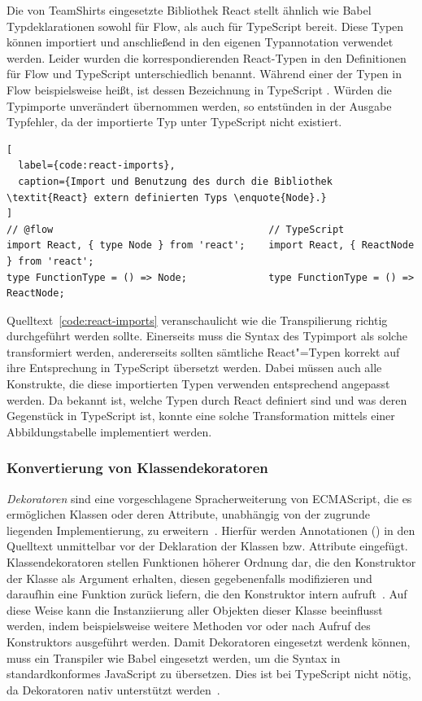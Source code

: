 {Die von TeamShirts eingesetzte Bibliothek React stellt ähnlich wie Babel Typdeklarationen sowohl für Flow, als auch für TypeScript bereit. Diese Typen können importiert und anschließend in den eigenen Typannotation verwendet werden. Leider wurden die korrespondierenden React-Typen in den Definitionen für Flow und TypeScript unterschiedlich benannt. Während einer der Typen in Flow beispielsweise  heißt, ist dessen Bezeichnung in TypeScript . Würden die Typimporte unverändert übernommen werden, so entstünden in der Ausgabe Typfehler, da der importierte Typ unter TypeScript nicht existiert.

\begin{lstlisting}[
  label={code:react-imports},
  caption={Import und Benutzung des durch die Bibliothek \textit{React} extern definierten Typs \enquote{Node}.}
]
// @flow                                     // TypeScript
import React, { type Node } from 'react';    import React, { ReactNode } from 'react';
type FunctionType = () => Node;              type FunctionType = () => ReactNode;
\end{lstlisting}

Quelltext~\ref{code:react-imports} veranschaulicht wie die Transpilierung richtig durchgeführt werden sollte. Einerseits muss die Syntax des Typimport als solche transformiert werden, andererseits sollten sämtliche React"=Typen korrekt auf ihre Entsprechung in TypeScript übersetzt werden. Dabei müssen auch alle Konstrukte, die diese importierten Typen verwenden entsprechend angepasst werden. Da bekannt ist, welche Typen durch React definiert sind und was deren Gegenstück in TypeScript ist, konnte eine solche Transformation mittels einer Abbildungstabelle implementiert werden.

\subsubsection{Konvertierung von Klassendekoratoren}
\label{sec:class-decorators}

\textit{Dekoratoren} sind eine vorgeschlagene Spracherweiterung von ECMAScript, die es ermöglichen Klassen oder deren Attribute, unabhängig von der zugrunde liegenden Implementierung, zu erweitern~\autocite{ES_PROPOSAL:DECORATORS}. Hierfür werden Annotationen () in den Quelltext unmittelbar vor der Deklaration der Klassen bzw. Attribute eingefügt. Klassendekoratoren stellen Funktionen höherer Ordnung dar, die den Konstruktor der Klasse als Argument erhalten, diesen gegebenenfalls modifizieren und daraufhin eine Funktion zurück liefern, die den Konstruktor intern aufruft~\autocite{ES_PROPOSAL:DECORATORS}. Auf diese Weise kann die Instanziierung aller Objekten dieser Klasse beeinflusst werden, indem beispielsweise weitere Methoden vor oder nach Aufruf des Konstruktors ausgeführt werden. Damit Dekoratoren eingesetzt werdenk können, muss ein Transpiler wie Babel eingesetzt werden, um die Syntax in standardkonformes JavaScript zu übersetzen. Dies ist bei TypeScript nicht nötig, da Dekoratoren nativ unterstützt werden~\autocite{TS:HANDBOOK:DECORATORS}.

}
